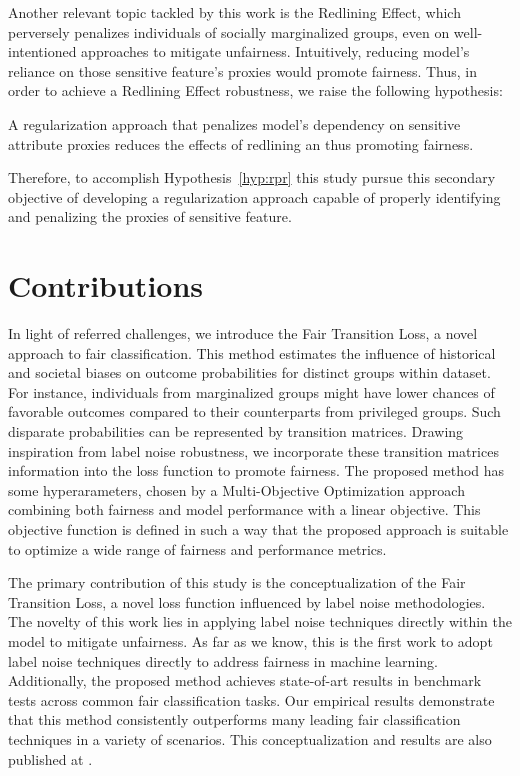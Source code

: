 Another relevant topic tackled by this work is the Redlining Effect, which perversely penalizes individuals of socially marginalized groups, even on well-intentioned approaches to mitigate unfairness. Intuitively, reducing model's reliance on those sensitive feature's proxies would promote fairness. Thus, in order to achieve a Redlining Effect robustness, we raise the following hypothesis:

\begin{hypothesis}\label{hyp:rpr}
A regularization approach that penalizes model's dependency on sensitive attribute proxies reduces the effects of redlining an thus promoting fairness. 
\end{hypothesis}

Therefore, to accomplish Hypothesis~\ref{hyp:rpr} this study pursue this secondary objective of developing a regularization approach capable of properly identifying and penalizing the proxies of sensitive feature. 

\section{Contributions}

In light of referred challenges, we introduce the Fair Transition Loss, a novel approach to fair classification. This method estimates the influence of historical and societal biases on outcome probabilities for distinct groups within dataset. For instance, individuals from marginalized groups might have lower chances of favorable outcomes compared to their counterparts from privileged groups. Such disparate probabilities can be represented by transition matrices. Drawing inspiration from label noise robustness, we incorporate these transition matrices information into the loss function to promote fairness. The proposed method has some hyperarameters, chosen by a Multi-Objective Optimization approach combining both fairness and model performance with a linear objective. This objective function is defined in such a way that the proposed approach is suitable to optimize a wide range of fairness and performance metrics.

The primary contribution of this study is the conceptualization of the Fair Transition Loss, a novel loss function influenced by label noise methodologies. The novelty of this work lies in applying label noise techniques directly within the model to mitigate unfairness. As far as we know, this is the first work to adopt label noise techniques directly to address fairness in machine learning. Additionally, the proposed method achieves state-of-art results in benchmark tests across common fair classification tasks. Our empirical results demonstrate that this method consistently outperforms many leading fair classification techniques in a variety of scenarios. This conceptualization and results are also published at \cite{Canalli2024}.

